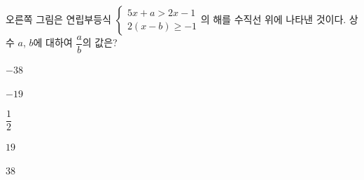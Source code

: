 \noindent\begin{minipage}[t]{0.58\linewidth}\vspace{0pt}\raggedright 오른쪽 그림은 연립부등식 $\begin{cases} 5x+a>2x-1 \\ 2(x-b)\ge -1 \end{cases}$의 해를 수직선 위에 나타낸 것이다. 상수 $a$, $b$에 대하여 $\dfrac{a}{b}$의 값은?\end{minipage}\hfill\begin{minipage}[t]{0.4\linewidth}\vspace{0pt}\centering \resizebox{\ifdim\width>\linewidth\linewidth\else\width\fi}{!}{}\end{minipage}\par
\begin{choices32}{\rule[-3ex]{0pt}{8ex}$-38$}{\rule[-3ex]{0pt}{8ex}$-19$}{\rule[-3ex]{0pt}{8ex}$\dfrac{1}{2}$}{\rule[-3ex]{0pt}{8ex}$19$}{\rule[-3ex]{0pt}{8ex}$38$}\end{choices32}
